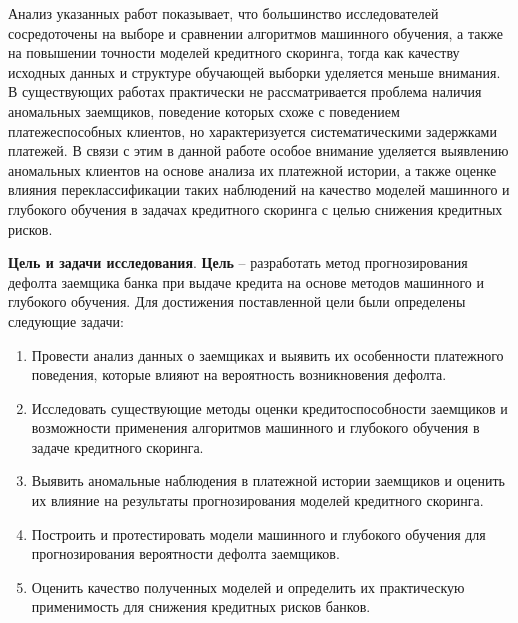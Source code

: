 	Анализ указанных работ показывает, что большинство исследователей сосредоточены на выборе и сравнении алгоритмов машинного обучения, а также на повышении точности моделей кредитного скоринга, тогда как качеству исходных данных и структуре обучающей выборки уделяется меньше внимания. В существующих работах практически не рассматривается проблема наличия аномальных заемщиков, поведение которых схоже с поведением платежеспособных клиентов, но характеризуется систематическими задержками платежей. В связи с этим в данной работе особое внимание уделяется выявлению аномальных клиентов на основе анализа их платежной истории, а также оценке влияния переклассификации таких наблюдений на качество моделей машинного и глубокого обучения в задачах кредитного скоринга с целью снижения кредитных рисков.
	 
	 
	
	\textbf{Цель и задачи исследования}. \textbf{Цель} -- разработать метод прогнозирования дефолта заемщика банка при выдаче кредита на основе методов машинного и глубокого обучения. Для достижения поставленной цели были определены следующие задачи:
	\begin{enumerate}[nosep]
	       \item Провести анализ данных о заемщиках и выявить их особенности платежного поведения, которые влияют на вероятность возникновения дефолта. 
           \item Исследовать существующие методы оценки кредитоспособности заемщиков и возможности применения алгоритмов машинного и глубокого обучения в задаче кредитного скоринга. 
           \item Выявить аномальные наблюдения в платежной истории заемщиков и оценить их влияние на результаты прогнозирования моделей кредитного скоринга. 
           \item Построить и протестировать модели машинного и глубокого обучения для прогнозирования вероятности дефолта заемщиков. 
           \item Оценить качество полученных моделей и определить их практическую применимость для снижения кредитных рисков банков.
        \end{enumerate}
        

